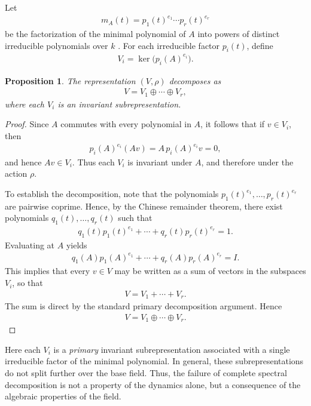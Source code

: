 \documentclass[letterpaper, 9pt, conference]{ieeeconf}
\newtheorem{proposition}[theorem]{Proposition}
\begin{document}
Let
\begin{eqnarray}
m_A(t) = p_1(t)^{e_1} \cdots p_r(t)^{e_r}
\end{eqnarray}
be the factorization of the minimal polynomial of $A$ into powers of distinct
irreducible polynomials over $k$ \cite{lang_algebra_book}. For each irreducible
factor $p_i(t)$, define
\begin{eqnarray}
V_i = \ker\big(p_i(A)^{e_i}\big).
\end{eqnarray}

\begin{proposition}
The representation $(V,\rho)$ decomposes as
\begin{eqnarray}
V = V_1 \oplus \cdots \oplus V_r,
\end{eqnarray}
where each $V_i$ is an invariant subrepresentation.
\end{proposition}

\begin{proof}
Since $A$ commutes with every polynomial in $A$, it follows that if $v \in V_i$,
then
\begin{eqnarray}
p_i(A)^{e_i}(Av) = A\,p_i(A)^{e_i}v = 0,
\end{eqnarray}
and hence $Av \in V_i$. Thus each $V_i$ is invariant under $A$, and therefore
under the action $\rho$.

To establish the decomposition, note that the polynomials
$p_1(t)^{e_1},\dots,p_r(t)^{e_r}$ are pairwise coprime. Hence, by the Chinese
remainder theorem, there exist polynomials $q_1(t),\dots,q_r(t)$ such that
\begin{eqnarray}
q_1(t)p_1(t)^{e_1} + \cdots + q_r(t)p_r(t)^{e_r} = 1.
\end{eqnarray}
Evaluating at $A$ yields
\begin{eqnarray}
q_1(A)p_1(A)^{e_1} + \cdots + q_r(A)p_r(A)^{e_r} = I.
\end{eqnarray}
This implies that every $v \in V$ may be written as a sum of vectors in the
subspaces $V_i$, so that
\begin{eqnarray*}
V = V_1 + \cdots + V_r.
\end{eqnarray*}
The sum is direct by the standard primary decomposition argument. Hence
\begin{eqnarray}
V = V_1 \oplus \cdots \oplus V_r.
\end{eqnarray}
\end{proof}

Here each $V_i$ is a \emph{primary} invariant subrepresentation associated with a
single irreducible factor of the minimal polynomial. In general, these
subrepresentations do not split further over the base field. Thus, the failure
of complete spectral decomposition is not a property of the dynamics alone, but
a consequence of the algebraic properties of the field.
\end{document}
